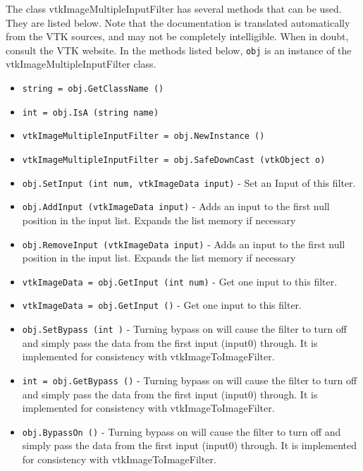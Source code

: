 The class vtkImageMultipleInputFilter has several methods that can be used.
  They are listed below.
Note that the documentation is translated automatically from the VTK sources,
and may not be completely intelligible.  When in doubt, consult the VTK website.
In the methods listed below, \verb|obj| is an instance of the vtkImageMultipleInputFilter class.
\begin{itemize}
\item  \verb|string = obj.GetClassName ()|

\item  \verb|int = obj.IsA (string name)|

\item  \verb|vtkImageMultipleInputFilter = obj.NewInstance ()|

\item  \verb|vtkImageMultipleInputFilter = obj.SafeDownCast (vtkObject o)|

\item  \verb|obj.SetInput (int num, vtkImageData input)| -  Set an Input of this filter. 

\item  \verb|obj.AddInput (vtkImageData input)| -  Adds an input to the first null position in the input list.
 Expands the list memory if necessary

\item  \verb|obj.RemoveInput (vtkImageData input)| -  Adds an input to the first null position in the input list.
 Expands the list memory if necessary

\item  \verb|vtkImageData = obj.GetInput (int num)| -  Get one input to this filter.

\item  \verb|vtkImageData = obj.GetInput ()| -  Get one input to this filter.

\item  \verb|obj.SetBypass (int )| -  Turning bypass on will cause the filter to turn off and
 simply pass the data from the first input (input0) through.  
 It is implemented for consistency with vtkImageToImageFilter.

\item  \verb|int = obj.GetBypass ()| -  Turning bypass on will cause the filter to turn off and
 simply pass the data from the first input (input0) through.  
 It is implemented for consistency with vtkImageToImageFilter.

\item  \verb|obj.BypassOn ()| -  Turning bypass on will cause the filter to turn off and
 simply pass the data from the first input (input0) through.  
 It is implemented for consistency with vtkImageToImageFilter.


\end{itemize}
